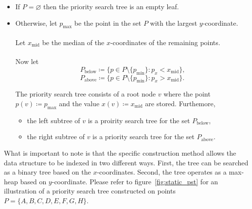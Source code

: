 \documentclass[twoside,11pt,openright]{report}
\begin{document}
\begin{itemize}
	\item If $P = \varnothing$ then the priority search tree is an empty leaf.
	\item Otherwise, let $p_\text{max}$ be the point in the set $P$ with the largest $y$-coordinate. \\ \\
			Let $x_{\text{mid}}$ be the median of the $x$-coordinates of the remaining points. \\ \\ Now let
			$$ P_\text{below} \coloneqq \{p \in P \setminus \{p_\text{min} \} : p_x < x_\text{mid} \}\text{,}$$
			$$ P_\text{above} \coloneqq \{p \in P \setminus \{p_\text{min} \} : p_x > x_\text{mid} \}\text{.}$$
			
			The priority search tree consists of a root node $v$ where the point \\
			$p(v) \coloneqq p_{\text{max}}$ and the value $x(v) \coloneqq x_{\text{mid}}$ are stored. Furthemore,
			\begin{itemize}[label=$\bullet$]
				\item the left subtree of $v$ is a proirity search tree for the set $P_{\text{below}}$,
				\item the right subtree of $v$ is a priority search tree for the set $P_{\text{above}}$.
			\end{itemize}
\end{itemize}

What is important to note is that the specific construction method allows the data structure to be indexed in two different ways. First, the tree can be searched as a binary tree based on the $x$-coordinates. Second, the tree operates as a max-heap based on $y$-coordinate. Please refer to figure~\ref{fig:static_pst} for an illustration of a priority search tree constructed on points $P = \{A, B, C, D, E, F, G, H\}$.
\end{document}
